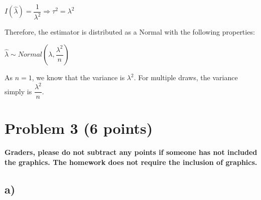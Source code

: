 \documentclass[12pt]{article}\usepackage[]{graphicx}\usepackage[]{color}
\begin{document}
\bigskip

$I(\hat{\lambda}) = \dfrac{1}{\lambda^2} \Rightarrow \tau^2 = \lambda^2$

\bigskip

Therefore, the estimator is distributed as a Normal with the following properties:

\bigskip

$\hat{\lambda} \sim Normal(\lambda,\dfrac{\lambda^2}{n})$

\bigskip

As $n = 1$, we know that the variance is $\lambda^2$. For multiple draws, the variance simply is $\dfrac{\lambda^2}{n}$.



\section*{Problem 3 (6 points)}

\textbf{Graders, please do not subtract any points if someone has not included the graphics. The homework does not require the inclusion of graphics.}

\subsection*{a)}
\end{document}
